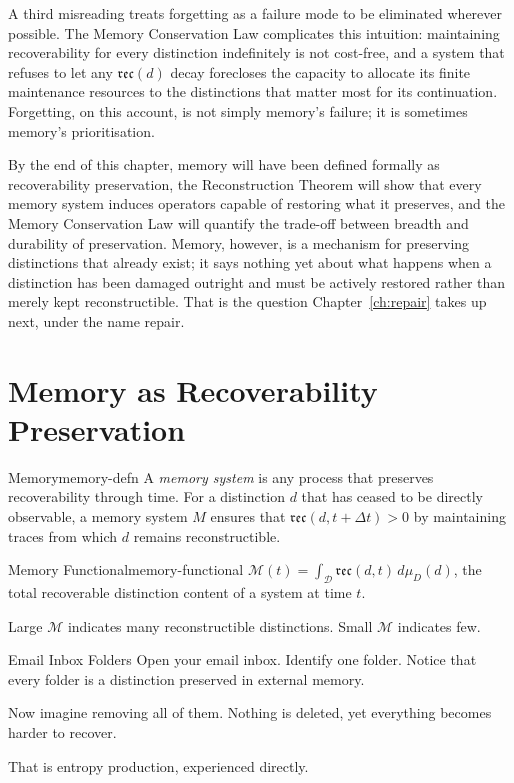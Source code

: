 \documentclass[12pt,twoside,openright]{book}
\newcommand{\reco}{\mathfrak{rec}}
\begin{document}
A third misreading treats forgetting as a failure mode to be
eliminated wherever possible. The Memory Conservation Law
complicates this intuition: maintaining recoverability for
every distinction indefinitely is not cost-free, and a system
that refuses to let any $\reco(d)$ decay forecloses the
capacity to allocate its finite maintenance resources to the
distinctions that matter most for its continuation.
Forgetting, on this account, is not simply memory's failure;
it is sometimes memory's prioritisation.

By the end of this chapter, memory will have been defined
formally as recoverability preservation, the Reconstruction
Theorem will show that every memory system induces operators
capable of restoring what it preserves, and the Memory
Conservation Law will quantify the trade-off between breadth
and durability of preservation. Memory, however, is a
mechanism for preserving distinctions that already exist; it
says nothing yet about what happens when a distinction has
been damaged outright and must be actively restored rather
than merely kept reconstructible. That is the question
Chapter~\ref{ch:repair} takes up next, under the name repair.

\section{Memory as Recoverability Preservation}
\label{sec:ch6-memory}

\begin{definition}{Memory}{memory-defn}
  A \emph{memory system} is any process that preserves
  recoverability through time. For a distinction $d$
  that has ceased to be directly observable, a memory
  system $M$ ensures that $\reco(d, t + \Delta t) > 0$
  by maintaining traces from which $d$ remains
  reconstructible.
\end{definition}

\begin{definition}{Memory Functional}{memory-functional}
  $\mathcal{M}(t) = \int_\mathcal{D} \reco(d, t)\,d\mu_D(d)$,
  the total recoverable distinction content of a system
  at time $t$.
\end{definition}

Large $\mathcal{M}$ indicates many reconstructible
distinctions. Small $\mathcal{M}$ indicates few.

\begin{distinctionaside}{Email Inbox Folders}
Open your email inbox. Identify one folder. Notice that every
folder is a distinction preserved in external memory.

Now imagine removing all of them. Nothing is deleted, yet
everything becomes harder to recover.

That is entropy production, experienced directly.
\end{distinctionaside}
\end{document}
